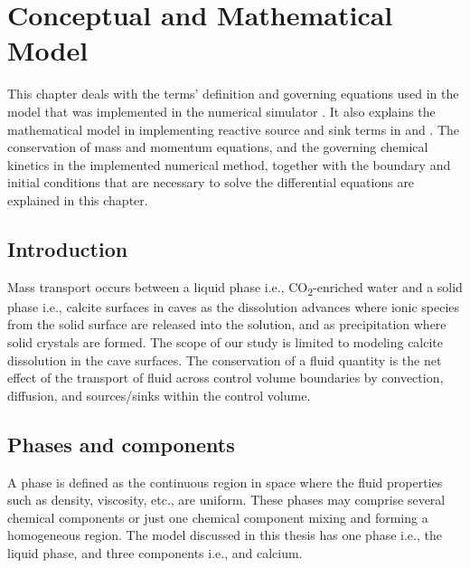 \chapter{Conceptual and Mathematical Model}\label{chapter:conceptualmodel}
\thispagestyle{empty}

This chapter deals with the terms' definition and governing equations used in the model that was 
implemented in the numerical simulator \DuMuX. It also explains the mathematical model 
in implementing reactive source and sink terms in \DuMuX and \MATLAB. The conservation of mass and momentum equations, 
and the governing chemical kinetics in the implemented numerical method, together with the boundary 
and initial conditions that are necessary to solve the differential equations are explained in this chapter. 

\section{Introduction}
Mass transport occurs between a liquid phase i.e., CO\textsubscript{2}-enriched water and a solid phase 
i.e., calcite surfaces in caves as the dissolution advances where ionic species from the solid surface are 
released into the solution, and as precipitation where solid crystals are formed. The scope of our study 
is limited to modeling calcite dissolution in the cave surfaces. The conservation of a 
fluid quantity is the net effect of the transport of fluid across control volume boundaries by convection, 
diffusion, and sources/sinks within the control volume.
 
\section{Phases and components}
A phase is defined as the continuous region in space where the fluid properties such as density, viscosity, etc., are uniform. 
These phases may comprise several chemical components or just one chemical component mixing and forming a homogeneous region. 
The model discussed in this thesis has one phase i.e., the liquid phase, and three components i.e.,  and calcium.

